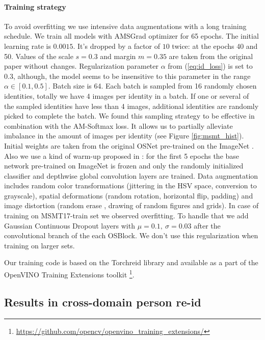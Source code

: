 \documentclass[a4paper,conference]{IEEEtran}
\begin{document}
\paragraph{Training strategy}

To avoid overfitting we use intensive data augmentations with a long training
schedule.  We train all models with AMSGrad optimizer \cite{amsgrad} for 65
epochs. The initial learning rate is $0.0015$.  It's dropped by a factor of $10$
twice: at the epochs 40 and 50.  Values of the scale $s=0.3$ and margin $m=0.35$ are taken
from the original paper \cite{amSoftmax} without changes. Regularization
parameter $\alpha$ from (\ref{eq:id_loss}) is set to $0.3$, although, the model
seems to be insensitive to this parameter in the range $\alpha\in[0.1,0.5]$.
Batch size is 64. Each batch is sampled from 16 randomly chosen identities, totally
we have 4 images per identity in a batch. If one or several of the sampled identities
have less than 4 images, additional identities are randomly picked to
complete the batch. We found this sampling strategy to be effective in combination with the AM-Softmax
loss. It allows us to partially alleviate imbalance in the amount of images per
identity (see Figure \ref{fig:msmt_hist}).  Initial weights are taken from the
original OSNet pre-trained on the ImageNet \cite{imagenet_cvpr09}.  Also we use
a kind of warm-up proposed in \cite{zhou2019osnet}: for the first 5 epochs the
base network pre-trained on ImageNet is frozen and only the randomly initialized
classifier and depthwise global convolution layers are trained.  Data augmentation
includes random color transformations (jittering in the HSV space, conversion to
grayscale), spatial deformations (random rotation, horizontal flip, padding) and
image distortion (random erase \cite{zhong2020random}, drawing of random figures
and grids). In case of training on MSMT17-train set we observed overfitting.
To handle that we add  Gaussian Continuous Dropout layers \cite{continuosDropout} with
$\mu=0.1,\:\sigma=0.03$ after the convolutional branch of the each OSBlock.
We don't use this regularization when training on larger sets.

Our training code is based on the Torchreid library
\cite{torchreid} and available as a part of the
OpenVINO\textsuperscript{\textregistered} Training Extensions toolkit
\footnote{\url{https://github.com/opencv/openvino_training_extensions/}}.

\subsection{Results in cross-domain person re-id}
\end{document}

